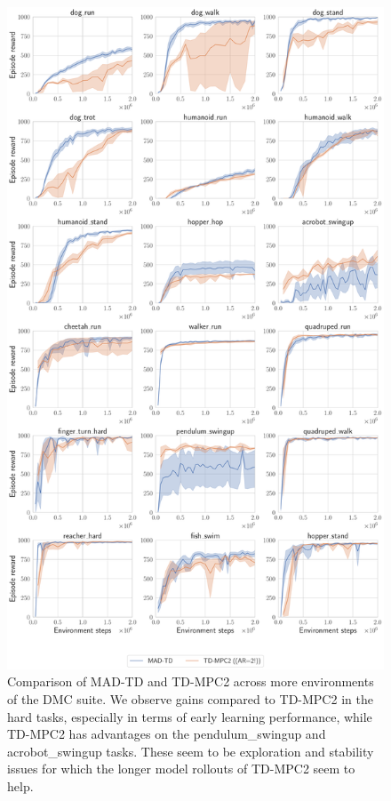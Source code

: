 \begin{figure}[H]
    \centering
    \includegraphics[width=.8\linewidth]{figures/mad-td/all_baseline_comp_rewards.pdf}
    \caption{Comparison of MAD-TD and TD-MPC2 across more environments of the DMC suite. We observe gains compared to TD-MPC2 in the hard tasks, especially in terms of early learning performance, while TD-MPC2 has advantages on the pendulum\_swingup and acrobot\_swingup tasks. These seem to be exploration and stability issues for which the longer model rollouts of TD-MPC2 seem to help.}
    \label{fig:mad:all_baseline}
\end{figure}

